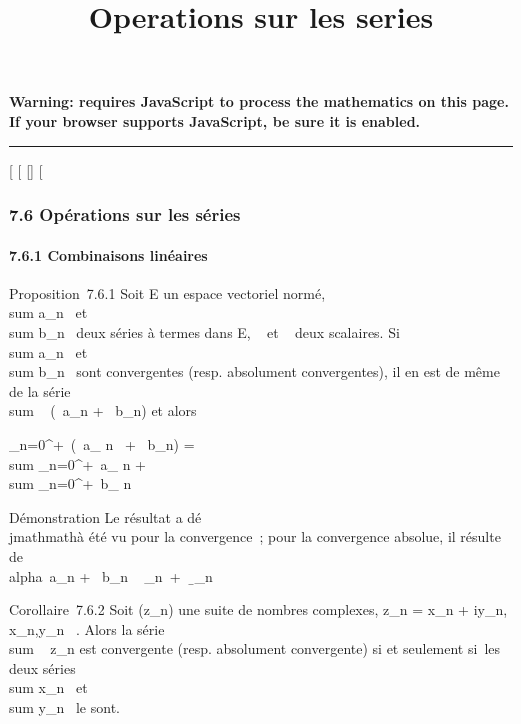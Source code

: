 \documentclass[]{article}
\title{Operations sur les series}
\author{}
\date{}
\begin{document}
\maketitle

\textbf{Warning: 
requires JavaScript to process the mathematics on this page.\\ If your
browser supports JavaScript, be sure it is enabled.}

\begin{center}\rule{3in}{0.4pt}\end{center}

{[}
{[}
{[}{]}
{[}

\subsubsection{7.6 Opérations sur les séries}

\paragraph{7.6.1 Combinaisons linéaires}

Proposition~7.6.1 Soit E un espace vectoriel normé,
\\sum  a_n~ et
\\sum  b_n~ deux
séries à termes dans E, \alpha~ et \beta~ deux scalaires. Si
\\sum  a_n~ et
\\sum  b_n~ sont
convergentes (resp. absolument convergentes), il en est de même de la
série \\sum ~
(\alpha~a_n + \beta~b_n) et alors

\sum _n=0^+\infty~(\alpha~a_ n~ +
\beta~b_n) = \alpha~\\sum
_n=0^+\infty~a_ n + \beta~\\sum
_n=0^+\infty~b_ n

Démonstration Le résultat a dé\\jmathmathà été vu pour la convergence~; pour la
convergence absolue, il résulte de
\\alpha~a_n +
\beta~b_n\
\leq\alpha~\,\a_n\
+
\beta~\,\b_n\

Corollaire~7.6.2 Soit (z_n) une suite de nombres complexes,
z_n = x_n + iy_n, x_n,y_n \in
\mathbb{R}~. Alors la série \\sum ~
z_n est convergente (resp. absolument convergente) si et
seulement si~les deux séries
\\sum  x_n~ et
\\sum  y_n~ le
sont.
\end{document}
